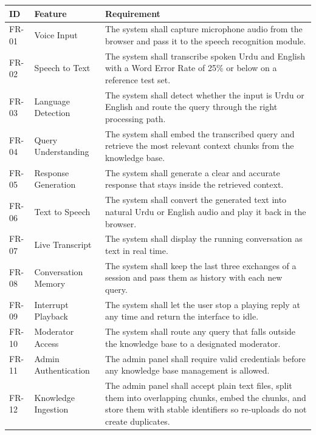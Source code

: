 \documentclass[12pt,a4paper]{report}
\begin{document}
\begin{longtable}{p{2cm} p{4cm} p{8.5cm}}
  \toprule
  \textbf{ID} & \textbf{Feature}         & \textbf{Requirement} \\
  \midrule
  \endhead
  FR-01 & Voice Input           & The system shall capture microphone audio from the browser and pass it to the speech recognition module. \\[4pt]
  FR-02 & Speech to Text        & The system shall transcribe spoken Urdu and English with a Word Error Rate of 25\% or below on a reference test set. \\[4pt]
  FR-03 & Language Detection    & The system shall detect whether the input is Urdu or English and route the query through the right processing path. \\[4pt]
  FR-04 & Query Understanding   & The system shall embed the transcribed query and retrieve the most relevant context chunks from the knowledge base. \\[4pt]
  FR-05 & Response Generation   & The system shall generate a clear and accurate response that stays inside the retrieved context. \\[4pt]
  FR-06 & Text to Speech        & The system shall convert the generated text into natural Urdu or English audio and play it back in the browser. \\[4pt]
  FR-07 & Live Transcript       & The system shall display the running conversation as text in real time. \\[4pt]
  FR-08 & Conversation Memory   & The system shall keep the last three exchanges of a session and pass them as history with each new query. \\[4pt]
  FR-09 & Interrupt Playback    & The system shall let the user stop a playing reply at any time and return the interface to idle. \\[4pt]
  FR-10 & Moderator Access      & The system shall route any query that falls outside the knowledge base to a designated moderator. \\[4pt]
  FR-11 & Admin Authentication  & The admin panel shall require valid credentials before any knowledge base management is allowed. \\[4pt]
  FR-12 & Knowledge Ingestion   & The admin panel shall accept plain text files, split them into overlapping chunks, embed the chunks, and store them with stable identifiers so re-uploads do not create duplicates. \\[4pt]
  \bottomrule
\end{longtable}
\end{document}
